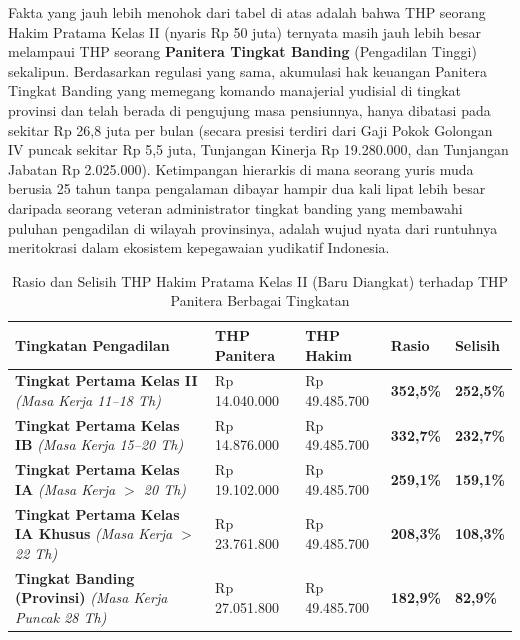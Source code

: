 \documentclass[12pt, a4paper]{article}
\begin{document}
Fakta yang jauh lebih menohok dari tabel di atas adalah bahwa THP seorang Hakim Pratama Kelas II (nyaris Rp 50 juta) ternyata masih jauh lebih besar melampaui THP seorang \textbf{Panitera Tingkat Banding} (Pengadilan Tinggi) sekalipun. Berdasarkan regulasi yang sama, akumulasi hak keuangan Panitera Tingkat Banding yang memegang komando manajerial yudisial di tingkat provinsi dan telah berada di pengujung masa pensiunnya, hanya dibatasi pada sekitar Rp 26,8 juta per bulan (secara presisi terdiri dari Gaji Pokok Golongan IV puncak sekitar Rp 5,5 juta, Tunjangan Kinerja Rp 19.280.000, dan Tunjangan Jabatan Rp 2.025.000). Ketimpangan hierarkis di mana seorang yuris muda berusia 25 tahun tanpa pengalaman dibayar hampir dua kali lipat lebih besar daripada seorang veteran administrator tingkat banding yang membawahi puluhan pengadilan di wilayah provinsinya, adalah wujud nyata dari runtuhnya meritokrasi dalam ekosistem kepegawaian yudikatif Indonesia.

\begin{table}[H]
\centering
\fontsize{10}{12}\selectfont
\caption{Rasio dan Selisih THP Hakim Pratama Kelas II (Baru Diangkat) terhadap THP Panitera Berbagai Tingkatan}
\label{tab:anomali-hierarki}
\renewcommand{\arraystretch}{1.4}
\begin{tabular}{p{4.6cm} p{2.6cm} p{2.6cm} p{1.5cm} p{1.5cm}}
\hline
\textbf{Tingkatan Pengadilan} & \textbf{THP Panitera} & \textbf{THP Hakim} & \textbf{Rasio} & \textbf{Selisih} \\
\hline
\raggedright\textbf{Tingkat Pertama Kelas II} \newline \textit{(Masa Kerja 11--18 Th)} & Rp 14.040.000 & Rp 49.485.700 & \textbf{352,5\%} & \textbf{252,5\%} \\
\raggedright\textbf{Tingkat Pertama Kelas IB} \newline \textit{(Masa Kerja 15--20 Th)} & Rp 14.876.000 & Rp 49.485.700 & \textbf{332,7\%} & \textbf{232,7\%} \\
\raggedright\textbf{Tingkat Pertama Kelas IA} \newline \textit{(Masa Kerja $>$ 20 Th)} & Rp 19.102.000 & Rp 49.485.700 & \textbf{259,1\%} & \textbf{159,1\%} \\
\raggedright\textbf{Tingkat Pertama Kelas IA Khusus} \newline \textit{(Masa Kerja $>$ 22 Th)} & Rp 23.761.800 & Rp 49.485.700 & \textbf{208,3\%} & \textbf{108,3\%} \\
\raggedright\textbf{Tingkat Banding (Provinsi)} \newline \textit{(Masa Kerja Puncak 28 Th)} & Rp 27.051.800 & Rp 49.485.700 & \textbf{182,9\%} & \textbf{82,9\%} \\
\hline
\end{tabular}
\end{table}
\end{document}
